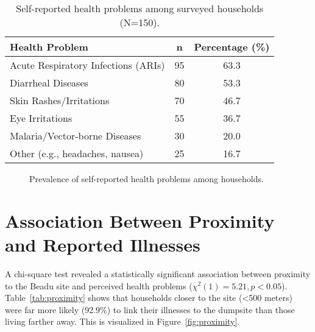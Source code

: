 \begin{table}[h!]
\centering
\caption{Self-reported health problems among surveyed households (N=150).}
\label{tab:health}
\begin{tabular}{@{}lcc@{}}
\toprule
\textbf{Health Problem} & \textbf{n} & \textbf{Percentage (\%)} \\ 
\midrule
Acute Respiratory Infections (ARIs) & 95 & 63.3 \\
Diarrheal Diseases                   & 80 & 53.3 \\
Skin Rashes/Irritations              & 70 & 46.7 \\
Eye Irritations                      & 55 & 36.7 \\
Malaria/Vector-borne Diseases        & 30 & 20.0 \\
Other (e.g., headaches, nausea)      & 25 & 16.7 \\
\bottomrule
\end{tabular}
\end{table}

\begin{figure}[h!]
\centering
{}
\caption{Prevalence of self-reported health problems among households.}
\label{fig:healthproblems}
\end{figure}


\section{Association Between Proximity and Reported Illnesses}

A chi-square test revealed a statistically significant association between proximity to the Beadu site and perceived health problems ($\chi^2(1)=5.21, p<0.05$). Table~\ref{tab:proximity} shows that households closer to the site (<500 meters) were far more likely (92.9\%) to link their illnesses to the dumpsite than those living farther away. This is visualized in Figure~\ref{fig:proximity}.

